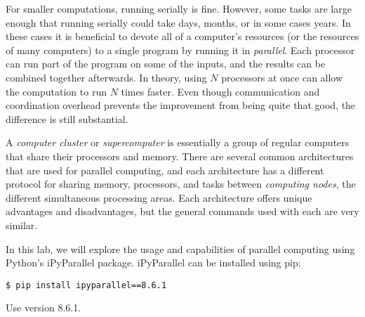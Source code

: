 \begin{comment} %
This can be visualized as a program that runs all of its computations on a single processor or core.
Figure \ref{fig:htop} visualizes what this would look like by using the Linux command \li{htop}.
This command shows which programs are running, how many resources they are using up, and how much each processor core is running.

\begin{figure}[!tbp]
  \begin{subfigure}[b]{0.49\textwidth}
    \texttt{[image: figures/activenew.jpg]}
    \caption{Serial}
  \end{subfigure}
  \hfill
  \begin{subfigure}[b]{0.49\textwidth}
    \texttt{[image: figures/cluster\_activenew.jpg]}
    \caption{Parallel}
  \end{subfigure}
  \caption{In the serial implementation, one core is running the program. In the parallel, it is split across all cores.}
  \label{fig:htop}
\end{figure}
\end{comment}

For smaller computations, running serially is fine.
However, some tasks are large enough that running serially could take days, months, or in some cases years.
In these cases it is beneficial to devote all of a computer's resources (or the resources of many computers) to a single program by running it in \emph{parallel}.
Each processor can run part of the program on some of the inputs, and the results can be combined together afterwards.
In theory, using $N$ processors at once can allow the computation to run $N$ times faster.
Even though communication and coordination overhead prevents the improvement from being quite that good, the difference is still substantial.

A \emph{computer cluster} or \emph{supercomputer} is essentially a group of regular computers that share their processors and memory.
There are several common architectures that are used for parallel computing, and each architecture has a different protocol for sharing memory, processors, and tasks between \emph{computing nodes}, the different simultaneous processing areas.
Each architecture offers unique advantages and disadvantages, but the general commands used with each are very similar.

In this lab, we will explore the usage and capabilities of parallel computing using Python's iPyParallel package.
iPyParallel can be installed using pip:
\begin{lstlisting}
$ pip install ipyparallel==8.6.1
\end{lstlisting}
Use version 8.6.1.

